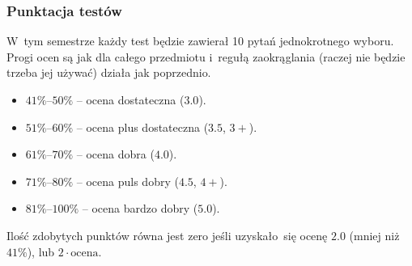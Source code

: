 \documentclass[10pt,t]{beamer}
\begin{document}
\begin{frame}
  \frametitle{Punktacja testów}


  W~tym semestrze każdy test będzie zawierał 10 pytań jednokrotnego wyboru.
  Progi ocen są jak dla całego przedmiotu i~regułą zaokrąglania (raczej nie
  będzie trzeba jej używać) działa jak poprzednio.

  \begin{itemize}

  \item $41\%\text{--}50\%$ -- ocena dostateczna ($3.0$).

  \item $51\%\text{--}60\%$ -- ocena plus dostateczna ($3.5$, $3+$).

  \item $61\%\text{--}70\%$ -- ocena dobra ($4.0$).

  \item $71\%\text{--}80\%$ -- ocena puls dobry ($4.5$, $4+$).

  \item $81\%\text{--}100\%$ -- ocena bardzo dobry ($5.0$).

  \end{itemize}

  Ilość zdobytych punktów równa jest zero jeśli uzyskało~się ocenę $2.0$
  (mniej niż $41\%$), lub $2 \cdot \text{ocena}$.

\end{frame}
\end{document}
